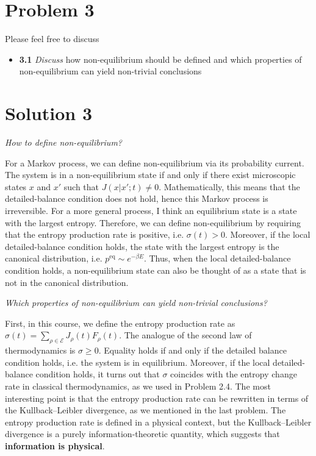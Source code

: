\documentclass[11pt]{article}
\begin{document}
	\section{Problem 3}
	
	Please feel free to discuss
	\begin{itemize}
		\item 	\textbf{3.1}
		\emph{Discuss} how non-equilibrium should be defined and which properties of non-equilibrium can yield non-trivial conclusions
	\end{itemize}
	
	\section*{Solution 3}
	\textit{How to define non-equilibrium?}
	
	For a Markov process, we can define non-equilibrium via its probability current. The system is in a non-equilibrium state if and only if there exist microscopic states $x$ and $x'$ such that $J(x|x';t)\neq 0$. Mathematically, this means that the detailed-balance condition does not hold, hence this Markov process is irreversible. For a more general process, I think an equilibrium state is a state with the largest entropy. Therefore, we can define non-equilibrium by requiring that the entropy production rate is positive, i.e. $\sigma(t)>0$. Moreover, if the local detailed-balance condition holds, the state with the largest entropy is the canonical distribution, i.e. $p^{\mathrm{eq}}\sim e^{-\beta E}$. Thus, when the local detailed-balance condition holds, a non-equilibrium state can also be thought of as a state that is not in the canonical distribution.
	
	
	\textit{Which properties of non-equilibrium can yield non-trivial conclusions?}
	
	First, in this course, we define the entropy production rate as $\sigma(t)=\sum_{\rho\in\mathcal{E}}J_\rho(t)F_\rho(t)$. The analogue of the second law of thermodynamics is $\sigma\geq 0$. Equality holds if and only if the detailed balance condition holds, i.e. the system is in equilibrium. Moreover, if the local detailed-balance condition holds, it turns out that $\sigma$ coincides with the entropy change rate in classical thermodynamics, as we used in Problem 2.4. The most interesting point is that the entropy production rate can be rewritten in terms of the Kullback--Leibler divergence, as we mentioned in the last problem. The entropy production rate is defined in a physical context, but the Kullback--Leibler divergence is a purely information-theoretic quantity, which suggests that \textbf{information is physical}.
	
\end{document}

